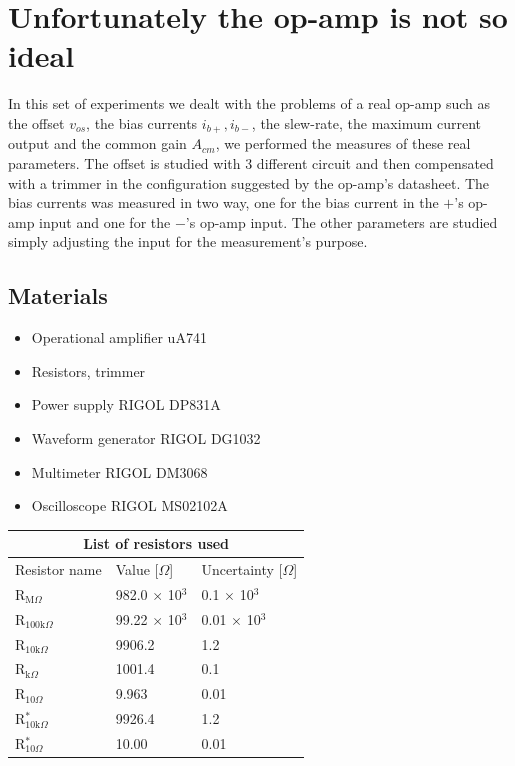 \chapter{Unfortunately the op-amp is not so ideal}
In this set of experiments we dealt with the problems of a real op-amp such as the offset $v_{os}$, the bias currents $i_{b+},i_{b-}$, the slew-rate, the maximum current output and the common gain $A_{cm}$, we performed the measures of these real parameters. The offset is studied with 3 different circuit and then compensated with a trimmer in the configuration suggested by the op-amp's datasheet. The bias currents was measured in two way, one for the bias current in the $+$'s op-amp input and one for the $-$'s op-amp input. The other parameters are studied simply adjusting the input for the measurement's purpose.

\section{Materials}
\begin{itemize}
\item Operational amplifier uA741
\item Resistors, trimmer
\item Power supply RIGOL DP831A
\item Waveform generator RIGOL DG1032
\item Multimeter RIGOL DM3068
\item Oscilloscope RIGOL MS02102A
\end{itemize}
\begin{table}[H]
\centering
\begin{tabular}{ |p{3cm}||p{3cm}|p{3cm}| }
 \hline
 \multicolumn{3}{|c|}{List of resistors used} \\
 \hline
 Resistor name & Value [$\Omega$] & Uncertainty [$\Omega$]\\
 \hline
 R$_{\text{M}\Omega}$   & 982.0 $\times$ 10$^3$ & 0.1 $\times$ 10$^3$  \\
 R$_{100\text{k}\Omega}$& 99.22 $\times$ 10$^3$ & 0.01 $\times$ 10$^3$ \\
 R$_{10\text{k}\Omega}$ &   9906.2            & 1.2         \\
 R$_{\text{k}\Omega}$   &  1001.4             & 0.1         \\
 R$_{10\Omega}$         &  9.963              & 0.01        \\
 R$_{10\text{k}\Omega}^*$ &  9926.4             & 1.2         \\
 R$_{10\Omega}^*$       &10.00                & 0.01        \\
 
 \hline
\end{tabular}
\end{table}
